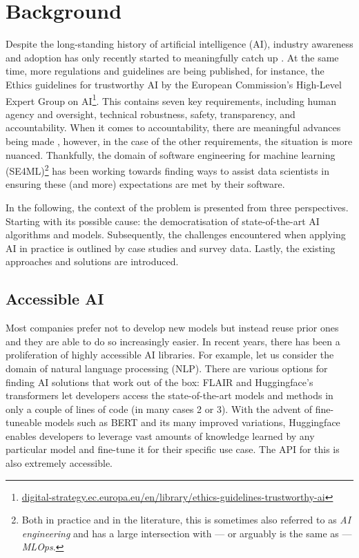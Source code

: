 \chapter{Background} \label{chapter:background}

Despite the long-standing history of artificial intelligence (AI), industry awareness and adoption has only recently started to meaningfully catch up \cite{wirtz2019artificial}. At the same time, more regulations and guidelines are being published, for instance, the Ethics guidelines for trustworthy AI by the European Commission's High-Level Expert Group on AI\footnote{\href{https://digital-strategy.ec.europa.eu/en/library/ethics-guidelines-trustworthy-ai}{digital-strategy.ec.europa.eu/en/library/ethics-guidelines-trustworthy-ai}}. This contains seven key requirements, including human agency and oversight, technical robustness, safety, transparency, and accountability. When it comes to accountability, there are meaningful advances being made \cite{raji2020closing}, however, in the case of the other requirements, the situation is more nuanced. Thankfully, the domain of software engineering for machine learning (SE4ML)\footnote{Both in practice and in the literature, this is sometimes also referred to as \textit{AI engineering} and has a large intersection with --- or arguably is the same as --- \textit{MLOps}.} has been working towards finding ways to assist data scientists in ensuring these (and more) expectations are met by their software.

In the following, the context of the problem is presented from three perspectives. Starting with its possible cause: the democratisation of state-of-the-art AI algorithms and models. Subsequently, the challenges encountered when applying AI in practice is outlined by case studies and survey data. Lastly, the existing approaches and solutions are introduced.

\section{Accessible AI}

Most companies prefer not to develop new models but instead reuse prior ones \cite{bosch2021engineering} and they are able to do so increasingly easier. In recent years, there has been a proliferation of highly accessible AI libraries. For example, let us consider the domain of natural language processing (NLP). There are various options for finding AI solutions that work out of the box: FLAIR \cite{akbik2019flair} and Huggingface's transformers \cite{wolf2019huggingface} let developers access the state-of-the-art models and methods in only a couple of lines of code (in many cases 2 or 3). With the advent of fine-tuneable models such as BERT \cite{devlin2018bert} and its many improved variations, Huggingface enables developers to leverage vast amounts of knowledge learned by any particular model and fine-tune it for their specific use case. The API for this is also extremely accessible.


